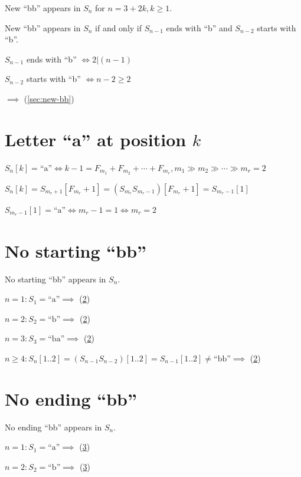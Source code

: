 \documentclass{article}
\begin{document}
New ``bb'' appears in \( S_{n} \) for \( n = 3 + 2k, k \geq 1 \).

New ``bb'' appears in \( S_{n} \) if and only if \( S_{n-1} \) ends with ``b'' and \( S_{n-2} \) starts with ``b''.

\( S_{n-1} \) ends with ``b'' \( \iff 2 | (n-1) \)

\( S_{n-2} \) starts with ``b'' \( \iff n - 2 \geq 2 \)

\( \implies \) (\ref{sec:new-bb})

\section{Letter ``a'' at position \( k \)}\label{sec:a-at-k}

\( S_{n}[k] = \text{``a''} \iff k - 1 = F_{m_{1}} + F_{m_{2}} + \cdots + F_{m_{r}}, m_{1} \gg m_{2} \gg \cdots \gg m_{r} = 2 \)

\( S_{n}[k] = S_{m_{r}+1}[F_{m_{r}}+1] = (S_{m_{r}}S_{m_{r}-1})[F_{m_{r}}+1] = S_{m_{r}-1}[1] \)

\( S_{m_{r}-1}[1] = \text{``a''} \iff m_{r}-1 = 1 \iff m_{r} = 2 \)

\section{No starting ``bb''}\label{sec:no-starting-bbb}

No starting ``bb'' appears in \( S_{n} \).

\( n = 1: S_{1} = \text{``a''} \implies \) (\ref{sec:no-starting-bbb})

\( n = 2: S_{2} = \text{``b''} \implies \) (\ref{sec:no-starting-bbb})

\( n = 3: S_{3} = \text{``ba''} \implies \) (\ref{sec:no-starting-bbb})

\( n \geq 4: S_{n}[1..2] = (S_{n-1}S_{n-2})[1..2] = S_{n-1}[1..2] \neq \text{``bb''} \implies \) (\ref{sec:no-starting-bbb})

\section{No ending ``bb''}\label{sec:no-ending-bbb}

No ending ``bb'' appears in \( S_{n} \).

\( n = 1: S_{1} = \text{``a''} \implies \) (\ref{sec:no-ending-bbb})

\( n = 2: S_{2} = \text{``b''} \implies \) (\ref{sec:no-ending-bbb})
\end{document}
